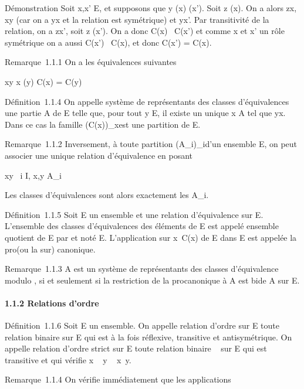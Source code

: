 \documentclass[]{article}
\begin{document}
Démonstration Soit x,x' \in E, et supposons que y \inC(x) \bigcapC(x'). Soit z
\inC(x). On a alors zx, xy (car on a yx et la relation est symétrique)
et yx'. Par transitivité de la relation, on a zx', soit z \inC(x'). On a
donc C(x) \subset~C(x') et comme x et x' \jmathouent un rôle symétrique on a aussi
C(x') \subset~C(x), et donc C(x') = C(x).

Remarque~1.1.1 On a les équivalences suivantes

xy \Leftrightarrow x \inC(y) \mathrel\Leftrightarrow
C(x) = C(y)

Définition~1.1.4 On appelle système de représentants des classes
d'équivalences une partie A de E telle que, pour tout y \in E, il existe
un unique x \in A tel que yx. Dans ce cas la famille
\left (C(x)\right )\_x\inA est une
partition de E.

Remarque~1.1.2 Inversement, à toute partition
(A\_i)\_i\inI d'un ensemble E, on peut associer une unique
relation d'équivalence en posant

xy \Leftrightarrow \exists~i \in I, x,y \in
A\_i

Les classes d'équivalences sont alors exactement les A\_i.

Définition~1.1.5 Soit E un ensemble et  une relation d'équivalence sur
E. L'ensemble des classes d'équivalences des éléments de E est appelé
ensemble quotient de E par  et noté E\diagup{}. L'application sur\jmathective
x\mapsto~C(x) de E dans E\diagup{} est appelée la
pro\jmathection (ou la sur\jmathection) canonique.

Remarque~1.1.3 A est un système de représentants des classes
d'équivalence modulo , si et seulement si la restriction de la
pro\jmathection canonique à A est bi\jmathective de A sur E\diagup{}.

\paragraph{1.1.2 Relations d'ordre}

Définition~1.1.6 Soit E un ensemble. On appelle relation d'ordre sur E
toute relation binaire \leqslant sur E qui est à la fois réflexive, transitive
et antisymétrique. On appelle relation d'ordre strict sur E toute
relation binaire \prec~ sur E qui est transitive et qui vérifie x \prec~ y \rigtharrow~
x\neq~y.

Remarque~1.1.4 On vérifie immédiatement que les applications
\end{document}
